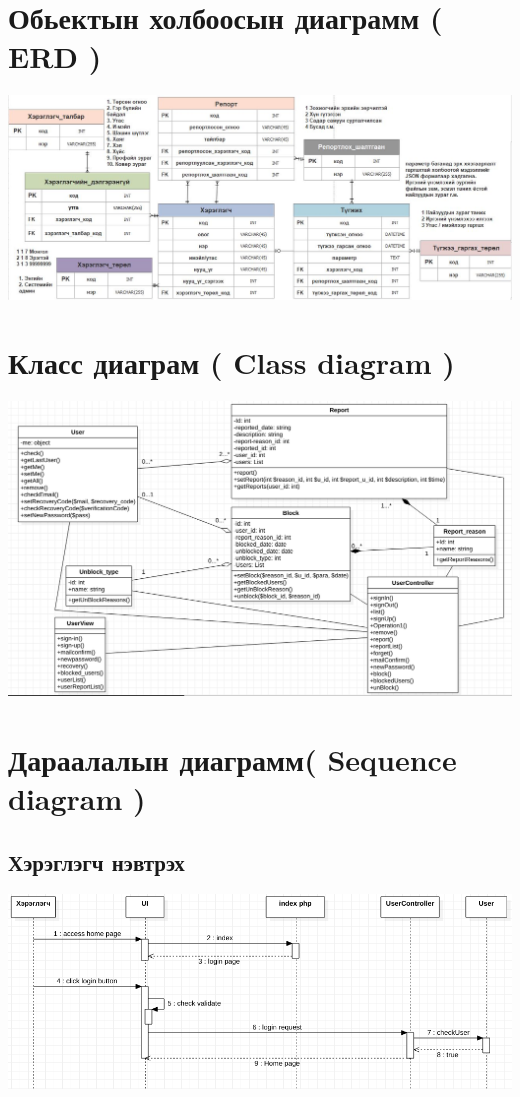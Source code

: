 \documentclass[
oneside, %
english, %
onehalfspacing, %
nolistspacing, %
headsepline, %
]{article} %
\begin{document}
     \section{Обьектын холбоосын диаграмм ( ERD )}
     \includegraphics[width=\textwidth]{ERDagram}
     
      \section{Класс диаграм ( Class diagram )}
     \includegraphics[width=\textwidth]{classdiagram}
     
     \section{Дараалалын диаграмм( Sequence diagram )}
     \subsection{Хэрэглэгч нэвтрэх}
     \includegraphics[width=\textwidth]{logi1}
\end{document}
